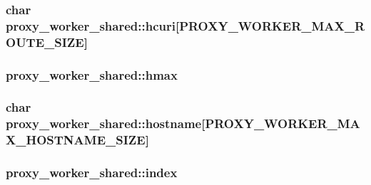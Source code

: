 \subsubsection[{\texorpdfstring{hcuri}{hcuri}}]{\setlength{\rightskip}{0pt plus 5cm}char proxy\+\_\+worker\+\_\+shared\+::hcuri\mbox{[}{\bf P\+R\+O\+X\+Y\+\_\+\+W\+O\+R\+K\+E\+R\+\_\+\+M\+A\+X\+\_\+\+R\+O\+U\+T\+E\+\_\+\+S\+I\+ZE}\mbox{]}}\hypertarget{structproxy__worker__shared_af5758d7e4b7cc9ef83dd9ae1b333b6f6}{}\label{structproxy__worker__shared_af5758d7e4b7cc9ef83dd9ae1b333b6f6}
\subsubsection[{\texorpdfstring{hmax}{hmax}}]{ proxy\+\_\+worker\+\_\+shared\+::hmax}\hypertarget{structproxy__worker__shared_a7c03c7a29e1fd3507ebee1c5f2f8249e}{}\label{structproxy__worker__shared_a7c03c7a29e1fd3507ebee1c5f2f8249e}
\subsubsection[{\texorpdfstring{hostname}{hostname}}]{\setlength{\rightskip}{0pt plus 5cm}char proxy\+\_\+worker\+\_\+shared\+::hostname\mbox{[}{\bf P\+R\+O\+X\+Y\+\_\+\+W\+O\+R\+K\+E\+R\+\_\+\+M\+A\+X\+\_\+\+H\+O\+S\+T\+N\+A\+M\+E\+\_\+\+S\+I\+ZE}\mbox{]}}\hypertarget{structproxy__worker__shared_a148cc100cd1adc298f72d5b290e083f8}{}\label{structproxy__worker__shared_a148cc100cd1adc298f72d5b290e083f8}
\subsubsection[{\texorpdfstring{index}{index}}]{ proxy\+\_\+worker\+\_\+shared\+::index}\hypertarget{structproxy__worker__shared_a8c4bad7ffd3277d98f2e469696292671}{}\label{structproxy__worker__shared_a8c4bad7ffd3277d98f2e469696292671}
